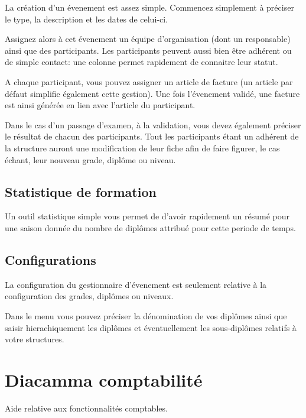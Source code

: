 \documentclass[a4paper,10pt,oneside,french]{sphinxmanual}
\begin{document}
La création d’un évenement est assez simple.
Commencez simplement à préciser le type, la description et les dates de celui-ci.

Assignez alors à cet évenement un équipe d’organisation (dont un responsable) ainsi que des participants.
Les participants peuvent aussi bien être adhérent ou de simple contact: une colonne permet rapidement de connaitre leur statut.

A chaque participant, vous pouvez assigner un article de facture (un article par défaut simplifie également cette gestion).
Une fois l’évenement validé, une facture est ainsi générée en lien avec l’article du participant.

Dans le cas d’un passage d’examen, à la validation, vous devez également préciser le résultat de chacun des participants.
Tout les participants étant un adhérent de la structure auront une modification de leur fiche afin de faire figurer, le cas échant, leur nouveau grade, diplôme ou niveau.


\section{Statistique de formation}
\label{\detokenize{event/statistic:statistique-de-formation}}\label{\detokenize{event/statistic::doc}}
Un outil statistique simple vous permet de d’avoir rapidement un résumé pour une saison donnée du nombre de diplômes attribué pour cette periode de temps.


\section{Configurations}
\label{\detokenize{event/config:configurations}}\label{\detokenize{event/config::doc}}
La configuration du gestionnaire d’évenement est seulement relative à la configuration des grades, diplômes ou niveaux.

Dans le menu  vous pouvez préciser la dénomination de vos diplômes
ainsi que saisir hierachiquement les diplômes et éventuellement les sous-diplômes relatifs à votre structures.


\chapter{Diacamma comptabilité}
\label{\detokenize{accounting/index:diacamma-comptabilite}}\label{\detokenize{accounting/index::doc}}
Aide relative aux fonctionnalités comptables.
\end{document}
